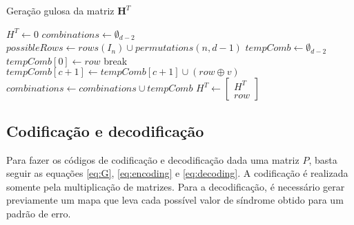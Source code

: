 \begin{algorithm}
\label{alg:geracao_matriz}
\caption{Geração gulosa da matriz $\textbf{H}^T$}
\begin{algorithmic}[1]
\State $H^T \gets 0$
\State $combinations \gets \emptyset_{d-2}$
\State $possibleRows \gets rows(I_n) \cup permutations(n, d - 1)$
    \State $tempComb \gets \emptyset_{d-2}$
    \State $tempComb[0] \gets row$
                \State break 
            \EndIf
                \State $tempComb[c + 1] \gets tempComb[c+1] \cup (row \oplus v)$
            \EndIf
        \EndFor
    \EndFor
    \State $combinations \gets combinations \cup tempComb$
    \State $H^T \gets \begin{bmatrix} H^T \\ row \end{bmatrix}$
\EndFor
\end{algorithmic}
\end{algorithm}

\subsection{Codificação e decodificação}

Para fazer os códigos de codificação e decodificação dada uma matriz $P$, basta seguir as equações \ref{eq:G}, \ref{eq:encoding} e \ref{eq:decoding}. A codificação é realizada somente pela multiplicação de matrizes. Para a decodificação, é necessário gerar previamente um mapa que leva cada possível valor de síndrome obtido para um padrão de erro.